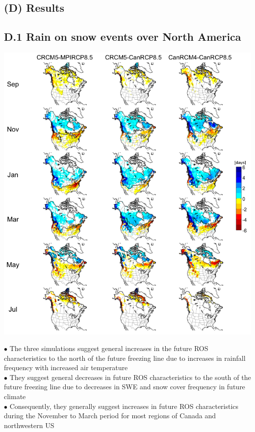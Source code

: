 \documentclass[a0,landscape]{a0poster}
\newcommand{\vspacebetweenbullets}{0.25cm}
\begin{document}
\begin{multicols*}{4}
\section*{(D) Results}

\subsection*{D.1 Rain on snow events over North America \citep{jeong2016ros}}
\begin{center}
\includegraphics[width=0.6\linewidth]{cc_num_of_ros}
\end{center}
$\bullet$ The three simulations suggest general increases in the future ROS
characteristics to the north of the future freezing line due to increases in
rainfall frequency with increased air temperature \\[\vspacebetweenbullets]
$\bullet$ They suggest general decreases in future ROS characteristics to the south of the
future freezing line due to decreases in SWE and snow cover frequency in future
climate \\[\vspacebetweenbullets]
$\bullet$ Consequently, they generally suggest increases in future ROS characteristics
during the November to March period for most regions of Canada and northwestern US


\end{multicols*}
\end{document}
